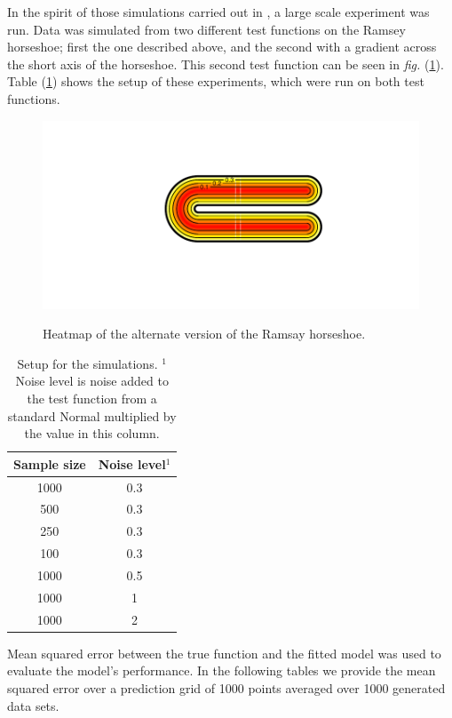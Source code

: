 \documentclass[a4paper,10pt]{amsart}
\newcommand{\fig}[1]{\emph{fig.} (\ref{#1})}
\begin{document}
In the spirit of those simulations carried out in \cite{soap}, a large scale experiment was run. Data was simulated from two different test functions on the Ramsey horseshoe; first the one described above, and the second with a gradient across the short axis of the horseshoe. This second test function can be seen in \fig{altramsayhorseshoe}. Table (\ref{simtable}) shows the setup of these experiments, which were run on both test functions.

\begin{figure}
\centering
\includegraphics[trim=0.5in 1in 0in 0.5in]{figs/altramsayhorseshoe.pdf} \\
\caption{Heatmap of the alternate version of the Ramsay horseshoe.}
\label{altramsayhorseshoe}
\end{figure}

\begin{table}[ht]
\begin{tabular}{c c}\\
Sample size & Noise level$^{1}$ \\
\hline
\hline
1000 & 0.3 \\
500 & 0.3 \\
250 & 0.3 \\
100 & 0.3 \\
1000 & 0.5 \\
1000 & 1 \\
1000 & 2 \\
\end{tabular}
\caption{Setup for the simulations. $^{1}$Noise level is noise added to the test function from a standard Normal multiplied by the value in this column.}
\label{simtable}
\end{table}

Mean squared error between the true function and the fitted model was used to evaluate the model's performance. In the following tables we provide the mean squared error over a prediction grid of 1000 points averaged over 1000 generated data sets.
\end{document}
